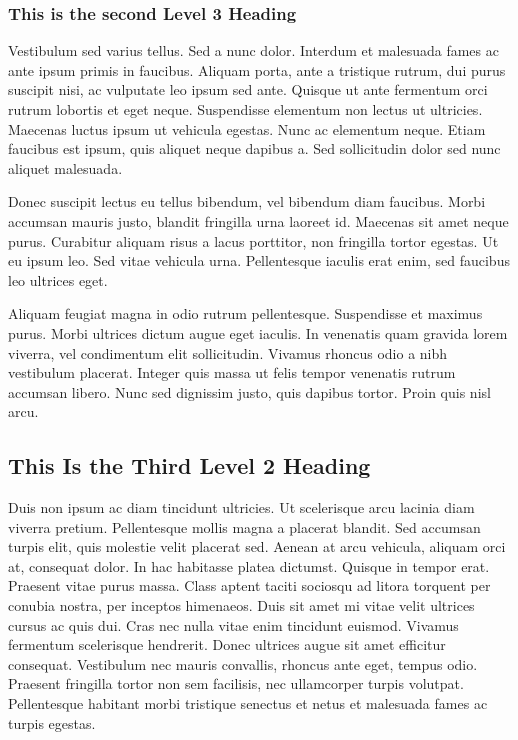 \subsubsection{This is the second Level 3 Heading}

Vestibulum sed varius tellus. Sed a nunc dolor. Interdum et malesuada fames ac ante ipsum primis in faucibus. Aliquam porta, ante a tristique rutrum, dui purus suscipit nisi, ac vulputate leo ipsum sed ante. Quisque ut ante fermentum orci rutrum lobortis et eget neque. Suspendisse elementum non lectus ut ultricies. Maecenas luctus ipsum ut vehicula egestas. Nunc ac elementum neque. Etiam faucibus est ipsum, quis aliquet neque dapibus a. Sed sollicitudin dolor sed nunc aliquet malesuada.

Donec suscipit lectus eu tellus bibendum, vel bibendum diam faucibus. Morbi accumsan mauris justo, blandit fringilla urna laoreet id. Maecenas sit amet neque purus. Curabitur aliquam risus a lacus porttitor, non fringilla tortor egestas. Ut eu ipsum leo. Sed vitae vehicula urna. Pellentesque iaculis erat enim, sed faucibus leo ultrices eget.

Aliquam feugiat magna in odio rutrum pellentesque. Suspendisse et maximus purus. Morbi ultrices dictum augue eget iaculis. In venenatis quam gravida lorem viverra, vel condimentum elit sollicitudin. Vivamus rhoncus odio a nibh vestibulum placerat. Integer quis massa ut felis tempor venenatis rutrum accumsan libero. Nunc sed dignissim justo, quis dapibus tortor. Proin quis nisl arcu.

\subsection{This Is the Third Level 2 Heading}



Duis non ipsum ac diam tincidunt ultricies. Ut scelerisque arcu lacinia diam viverra pretium. Pellentesque mollis magna a placerat blandit. Sed accumsan turpis elit, quis molestie velit placerat sed. Aenean at arcu vehicula, aliquam orci at, consequat dolor. In hac habitasse platea dictumst. Quisque in tempor erat. Praesent vitae purus massa. Class aptent taciti sociosqu ad litora torquent per conubia nostra, per inceptos himenaeos. Duis sit amet mi vitae velit ultrices cursus ac quis dui. Cras nec nulla vitae enim tincidunt euismod. Vivamus fermentum scelerisque hendrerit. Donec ultrices augue sit amet efficitur consequat. Vestibulum nec mauris convallis, rhoncus ante eget, tempus odio. Praesent fringilla tortor non sem facilisis, nec ullamcorper turpis volutpat. Pellentesque habitant morbi tristique senectus et netus et malesuada fames ac turpis egestas.

